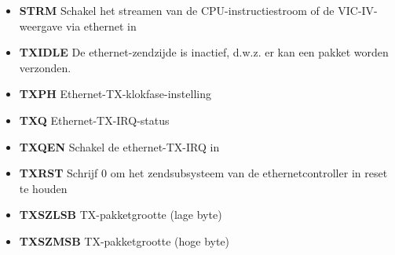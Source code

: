 \begin{itemize}
\item{\bf{STRM}} Schakel het streamen van de CPU-instructiestroom of de VIC-IV-weergave via ethernet in
\item{\bf{TXIDLE}} De ethernet-zendzijde is inactief, d.w.z. er kan een pakket worden verzonden.
\item{\bf{TXPH}} Ethernet-TX-klokfase-instelling
\item{\bf{TXQ}} Ethernet-TX-IRQ-status
\item{\bf{TXQEN}} Schakel de ethernet-TX-IRQ in
\item{\bf{TXRST}} Schrijf 0 om het zendsubsysteem van de ethernetcontroller in reset te houden
\item{\bf{TXSZLSB}} TX-pakketgrootte (lage byte)
\item{\bf{TXSZMSB}} TX-pakketgrootte (hoge byte)
\end{itemize}
